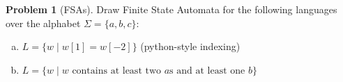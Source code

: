 \documentclass[10pt]{article}
\theoremstyle{definition}
\newtheorem{problem}{Problem}
\newcommand{\solution}[1]{
  \begin{tcolorbox}[breakable,title=Solution \arabic{problem}:,title after break={Solution \arabic{problem}, continued},colframe=black,colback=white,colbacktitle=white,coltitle=black,fonttitle=\bfseries,titlerule=0mm,arc=0mm,lefttitle=-1pt]
    #1
  \end{tcolorbox}
}
\begin{document}
\begin{problem}[FSAs]
  Draw Finite State Automata for the following languages over the alphabet $\Sigma = \{a,b,c\}$:
  \begin{enumerate}[(a)]
  \item $L = \{ w \mid w[1] = w[-2] \}$ (python-style indexing)
  \item $L = \{ w \mid w \text{ contains at least two $a$s and at least one $b$} \}$
  \end{enumerate}
\end{problem}

\end{document}
